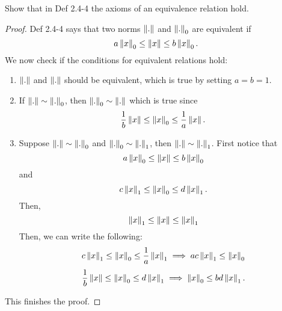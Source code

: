 \begin{question}
    Show that in Def 2.4-4 the axioms of an equivalence relation hold.
    \label{section2.4-3}
\end{question}
\begin{proof}
    Def 2.4-4 says that two norms $\norm{.}$ and $\norm{.}_0$ are equivalent if 
    \[a \norm{x}_0 \leq \norm{x} \leq b \norm{x}_0.\]
     We now check if the conditions for equivalent relations hold:
     \begin{enumerate}
         \item $\norm{.}$ and $\norm{.}$ should be equivalent, which is true by setting $a = b = 1$.
         \item If $\norm{.} \sim \norm{.}_0$, then $\norm{.}_0 \sim \norm{.}$ which is true since
         \[\frac{1}{b} \norm{x} \leq \norm{x}_0 \leq \frac{1}{a} \norm{x}.\]
         \item Suppose $\norm{.} \sim \norm{.}_0$ and $\norm{.}_0 \sim \norm{.}_1$, then $\norm{.} \sim \norm{.}_1$. First notice that
         \[a \norm{x}_0 \leq \norm{x} \leq b \norm{x}_0\]
         and 
         \[c\norm{x}_1 \leq \norm{x}_0 \leq d\norm{x}_1.\]
         Then, 
         \[\norm{x}_1 \leq \norm{x} \leq \norm{x}_1\]
         Then, we can write the following:
         \[c\norm{x}_1 \leq \norm{x}_0 \leq \frac{1}{a} \norm{x}_1 \implies ac\norm{x}_1 \leq \norm{x}_0\]
         \[\frac{1}{b}\norm{x} \leq \norm{x}_0 \leq d\norm{x}_1 \implies \norm{x}_0 \leq bd \norm{x}_1.\]
     \end{enumerate}
     This finishes the proof.
\end{proof}

